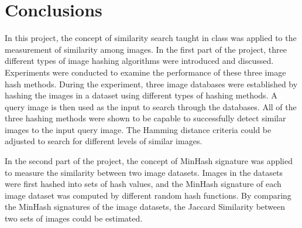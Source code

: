 \documentclass[letterpaper,12pt]{article}
\begin{document}
\section{Conclusions}
In this project, the concept of similarity search taught in class was applied to the measurement of similarity among images. In the first part of the project, three different types of image hashing algorithms were introduced and discussed. Experiments were conducted to examine the performance of these three image hash methods. During the experiment, three image databases were established by hashing the images in a dataset using different types of hashing methods. A query image is then used as the input to search through the databases. All of the three hashing methods were shown to be capable to successfully detect similar images to the input query image. The Hamming distance criteria could be adjusted to search for different levels of similar images.

In the second part of the project, the concept of MinHash signature was applied to measure the similarity between two image datasets. Images in the datasets were first hashed into sets of hash values, and the MinHash signature of each image dataset was computed by different random hash functions. By comparing the MinHash signatures of the image datasets, the Jaccard Similarity between two sets of images could be estimated. 



\end{document}
